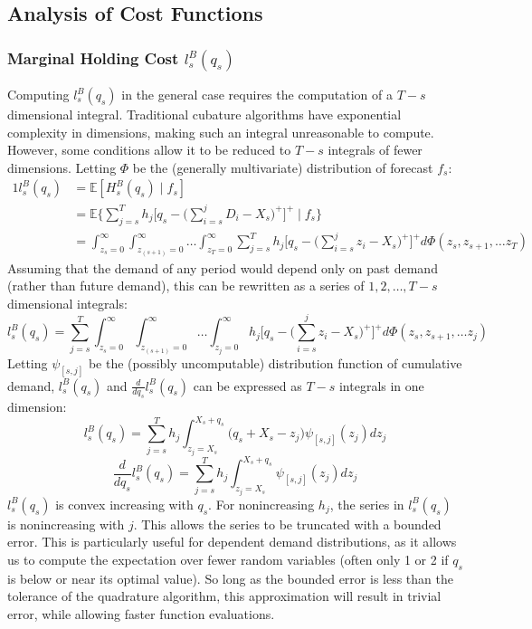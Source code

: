 \documentclass[12pt]{article}
\newcommand{\EX}{\mathbb{E}}
\begin{document}
\subsection{Analysis of Cost Functions}

\subsubsection*{Marginal Holding Cost $l_s^B(q_s)$}

Computing $l_s^B(q_s)$ in the general case requires the computation of a $T - s$ dimensional integral. Traditional cubature algorithms have exponential complexity in dimensions, making such an integral unreasonable to compute. However, some conditions allow it to be reduced to $T-s$ integrals of fewer dimensions. Letting $\Phi$ be the (generally multivariate) distribution of forecast $f_s$: 
\begin{alignat*}{1}
	l_s^B(q_s) &= \EX [H_s^B(q_s) \; | \; f_s] \\
        &= \EX \bigg\{\sum_{j=s}^T h_j\bigg[q_s - \bigg(\sum_{i=s}^j D_i - X_s\bigg)^+\bigg]^+  \; | \; f_s \bigg\} \\
		&= \int_{z_s=0}^{\infty} \int_{z_{(s+1)}=0}^{\infty}\dots \int_{z_T=0}^{\infty}\sum_{j=s}^T h_j\bigg[q_s - \bigg(\sum_{i=s}^j z_i - X_s\bigg)^+\bigg]^+ d\Phi(z_s, z_{s+1}, \dots z_T)
\end{alignat*}
Assuming that the demand of any period would depend only on past demand (rather than future demand), this can be rewritten as a series of $1, 2, \dots, T - s$ dimensional integrals: 
\begin{equation*}
	  l_s^B(q_s) = \sum_{j=s}^T \int_{z_s=0}^{\infty} \int_{z_{(s+1)}=0}^{\infty}\dots \int_{z_j=0}^{\infty} h_j\bigg[q_s - \bigg(\sum_{i=s}^j z_i - X_s\bigg)^+\bigg]^+ d\Phi(z_s, z_{s+1}, \dots z_j)
\end{equation*}
Letting $\psi_{[s,j]}$ be the (possibly uncomputable) distribution function of cumulative demand, $l_s^B(q_s)$ and $\frac{d}{d q_s} l_s^B(q_s)$ can be expressed as $T - s$ integrals in one dimension:
\begin{equation}
	l_s^B(q_s) = \sum_{j=s}^T  h_j \int_{z_j=X_s}^{X_s + q_s}\bigg(q_s + X_s - z_j \bigg) \psi_{[s,j]} (z_j) dz_j
\end{equation}
\begin{equation}
	\frac{d}{d q_s} l_s^B(q_s) =  \sum_{j=s}^T h_j \int_{z_j=X_s}^{X_s + q_s}  \psi_{[s,j]}(z_j) dz_j
\end{equation}
$l_s^B(q_s)$ is convex increasing with $q_s$. For nonincreasing $h_j$, the series in $l_s^B(q_s)$ is nonincreasing with $j$. This allows the series to be truncated with a bounded error. This is particularly useful for dependent demand distributions, as it allows us to compute the expectation over fewer random variables (often only 1 or 2 if $q_s$ is below or near its optimal value). So long as the bounded error is less than the tolerance of the quadrature algorithm, this approximation will result in trivial error, while allowing faster function evaluations.\\
\end{document}
